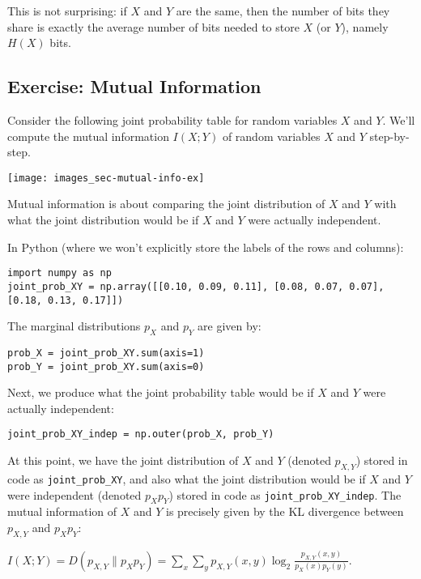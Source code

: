 \documentclass[6008notes.tex]{subfiles}
\begin{document}
This is not surprising: if $X$ and $Y$ are the same, then the number of bits they share is exactly the average number of bits needed to store $X$ (or $Y$), namely $H(X)$ bits.

\subsection{Exercise: Mutual Information}

Consider the following joint probability table for random variables $X$ and $Y$. We'll compute the mutual information $I(X;Y)$ of random variables $X$ and $Y$ step-by-step.

{\centering\texttt{[image: images\_sec-mutual-info-ex]} \par}

Mutual information is about comparing the joint distribution of $X$ and $Y$ with what the joint distribution would be if $X$ and $Y$ were actually independent.

In Python (where we won't explicitly store the labels of the rows and columns):

\begin{lstlisting}
import numpy as np
joint_prob_XY = np.array([[0.10, 0.09, 0.11], [0.08, 0.07, 0.07], [0.18, 0.13, 0.17]])
\end{lstlisting}

The marginal distributions $p_X$ and $p_Y$ are given by:

\begin{lstlisting}
prob_X = joint_prob_XY.sum(axis=1)
prob_Y = joint_prob_XY.sum(axis=0)
\end{lstlisting}

Next, we produce what the joint probability table would be if $X$ and $Y$ were actually independent:

\begin{lstlisting}
joint_prob_XY_indep = np.outer(prob_X, prob_Y)
\end{lstlisting}

At this point, we have the joint distribution of $X$ and $Y$ (denoted $p_{X,Y}$) stored in code as \lstinline{joint_prob_XY}, and also what the joint distribution would be if $X$ and $Y$ were independent (denoted $p_Xp_Y$) stored in code as \lstinline{joint_prob_XY_indep}. The mutual information of $X$ and $Y$ is precisely given by the KL divergence between $p_{X,Y}$ and $p_Xp_Y$:

{\centering$I(X;Y) = D(p_{X,Y}\parallel p_{X}p_{Y}) = \sum _ x \sum _ y p_{X, Y}(x, y) \log _2 \frac{p_{X, Y}(x, y)}{p_ X(x) p_ Y(y)}.$ \par}
\end{document}
